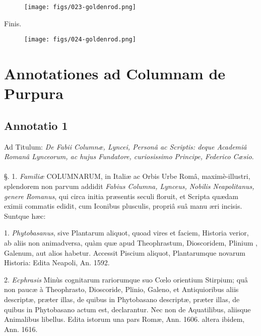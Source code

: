 \documentclass[a4paper, 11pt, oneside, polutonikogreek, german]{article}
\begin{document}
\begin{figure}[H]
\centering
\texttt{[image: figs/023-goldenrod.png]}

\end{figure}
\begin{center}
Finis.
\end{center}
\begin{figure}[H]
\centering
\texttt{[image: figs/024-goldenrod.png]}

\end{figure}
\clearpage
\section{Annotationes ad Columnam de Purpura}

\subsection{Annotatio 1}
\begin{center}
Ad Titulum: \emph{De Fabii Columnæ, Lyncei, Personâ ac Scriptis: deque Academiâ Romanâ Lynceorum, ac hujus Fundatore, curiosissimo Principe, Federico Cæsio}.
\end{center}
\paragraph{}
§. 1. \emph{Familiæ} COLUMNARUM, in Italiæ ac Orbis Urbe Româ, maximè-illustri, splendorem non parvum addidit \emph{Fabius Columna, Lynceus, Nobilis Neapolitanus, genere Romanus}, qui circa initia præsentis seculi floruit, et Scripta quædam eximii commatis edidit, cum Iconibus plusculis, propriâ suâ manu æri incisis. Suntque hæc:

1. \emph{Phytobasanus}, sive Plantarum aliquot, quoad vires et faciem, Historia verior, ab aliis non animadversa, quàm quæ apud Theophrastum, Dioscoridem, Plinium , Galenum, aut alios habetur. Accessit Piscium aliquot, Plantarumque novarum Historia: Edita Neapoli, An. 1592.

2. \emph{Ecphrasis} Minùs cognitarum rariorumque suo Cœlo orientium Stirpium; quâ non paucæ à Theophrasto, Dioscoride, Plinio, Galeno, et Antiquioribus aliis descriptæ, præter illas, de quibus in Phytobasano descriptæ, præter illas, de quibus in Phytobasano actum est, declarantur. Nec non de Aquatilibus, aliisque Animalibus libellus. Edita istorum una pars Romæ, Ann. 1606. altera ibidem, Ann. 1616.
\end{document}
